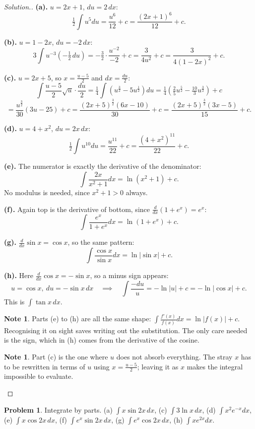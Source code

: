 \documentclass[11pt,a4paper]{article}
\theoremstyle{definition}
\newtheorem{note}[thm]{Note}
\newtheorem{problemx}{Problem}[section]
\newenvironment{problem}{\begin{problemx}}{\end{problemx}}
\newenvironment{solution}
  {\renewcommand{\qedsymbol}{}\begin{proof}[\textit{Solution}.]}
  {\end{proof}}
\begin{document}
\begin{solution}
\textbf{(a).} $u=2x+1$, $du=2\,dx$:
$$\tfrac{1}{2}\int u^5du=\frac{u^6}{12}+c=\frac{(2x+1)^6}{12}+c.$$

\textbf{(b).} $u=1-2x$, $du=-2\,dx$:
$$3\int u^{-3}\left(-\tfrac{1}{2}\,du\right)=-\tfrac{3}{2}\cdot\frac{u^{-2}}{-2}+c
=\frac{3}{4u^2}+c=\frac{3}{4(1-2x)^2}+c.$$

\textbf{(c).} $u=2x+5$, so $x=\frac{u-5}{2}$ and $dx=\frac{du}{2}$:
$$\int\frac{u-5}{2}\sqrt{u}\cdot\frac{du}{2}=\tfrac{1}{4}\int\left(u^{\frac{3}{2}}
-5u^{\frac{1}{2}}\right)du=\tfrac{1}{4}\left(\tfrac{2}{5}u^{\frac{5}{2}}
-\tfrac{10}{3}u^{\frac{3}{2}}\right)+c$$
$$=\frac{u^{\frac{3}{2}}}{30}\left(3u-25\right)+c
=\frac{(2x+5)^{\frac{3}{2}}(6x-10)}{30}+c=\frac{(2x+5)^{\frac{3}{2}}(3x-5)}{15}+c.$$

\textbf{(d).} $u=4+x^2$, $du=2x\,dx$:
$$\tfrac{1}{2}\int u^{10}du=\frac{u^{11}}{22}+c=\frac{\left(4+x^2\right)^{11}}{22}+c.$$

\textbf{(e).} The numerator is exactly the derivative of the denominator:
$$\int\frac{2x}{x^2+1}dx=\ln\left(x^2+1\right)+c.$$
No modulus is needed, since $x^2+1>0$ always.

\textbf{(f).} Again top is the derivative of bottom, since
$\frac{d}{dx}\left(1+e^x\right)=e^x$:
$$\int\frac{e^x}{1+e^x}dx=\ln\left(1+e^x\right)+c.$$

\textbf{(g).} $\frac{d}{dx}\sin x=\cos x$, so the same pattern:
$$\int\frac{\cos x}{\sin x}dx=\ln|\sin x|+c.$$

\textbf{(h).} Here $\frac{d}{dx}\cos x=-\sin x$, so a minus sign appears:
$$u=\cos x,\ du=-\sin x\,dx\quad\implies\quad \int\frac{-du}{u}=-\ln|u|+c
=-\ln|\cos x|+c.$$
This is $\int\tan x\,dx$.

\begin{note}
Parts (e) to (h) are all the same shape: $\int\frac{f'(x)}{f(x)}dx=\ln|f(x)|+c$.
Recognising it on sight saves writing out the substitution. The only care needed is the
sign, which in (h) comes from the derivative of the cosine.
\end{note}

\begin{note}
Part (c) is the one where $u$ does not absorb everything. The stray $x$ has to be
rewritten in terms of $u$ using $x=\frac{u-5}{2}$; leaving it as $x$ makes the integral
impossible to evaluate.
\end{note}
\end{solution}

\begin{problem}
Integrate by parts.
\quad (a) $\int x\sin 2x\,dx$, \quad (c) $\int 3\ln x\,dx$, \quad
(d) $\int x^2e^{-x}dx$, \quad (e) $\int x\cos 2x\,dx$, \quad
(f) $\int e^x\sin 2x\,dx$, \quad (g) $\int e^x\cos 2x\,dx$, \quad
(h) $\int xe^{2x}dx$.
\end{problem}
\end{document}
